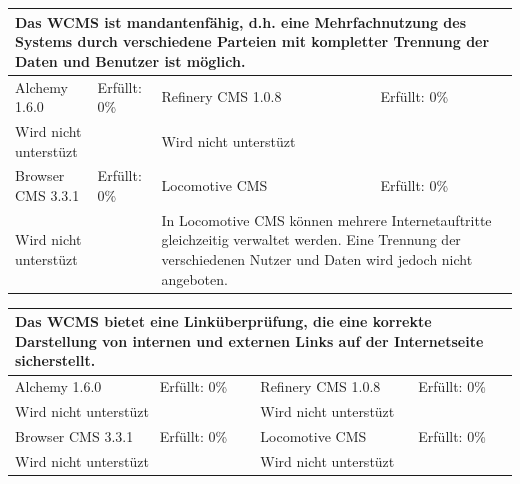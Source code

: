 \begin{tabular}[!ht]{|l|l|l|l|}
\hline
\multicolumn{4}{|p{15cm}|}{\textbf{Das WCMS ist mandantenfähig, d.h. eine Mehrfachnutzung des Systems durch verschiedene Parteien mit kompletter Trennung der Daten und Benutzer ist möglich.}} \\
\hline
  Alchemy 1.6.0 & \cellcolor{red}Erfüllt: 0\% & Refinery CMS 1.0.8 & \cellcolor{red}Erfüllt: 0\% \\
  \hline
  \multicolumn{2}{|p{7.5cm}|}{Wird nicht unterstüzt} & \multicolumn{2}{p{7.5cm}|}{Wird nicht unterstüzt} \\
  \hline
  Browser CMS 3.3.1 & \cellcolor{red}Erfüllt: 0\% & Locomotive CMS & \cellcolor{red}Erfüllt: 0\% \\
  \hline
  \multicolumn{2}{|p{7.5cm}|}{Wird nicht unterstüzt} & \multicolumn{2}{p{7.5cm}|}{In Locomotive CMS können mehrere Internetauftritte gleichzeitig verwaltet werden. Eine Trennung der verschiedenen Nutzer und Daten wird jedoch nicht angeboten.} \\
\hline
\end{tabular}
\newline
\newline
\newline
\begin{tabular}[!ht]{|l|l|l|l|}
\hline
\multicolumn{4}{|p{15cm}|}{\textbf{Das WCMS bietet eine Linküberprüfung, die eine korrekte Darstellung von internen und externen Links auf der Internetseite sicherstellt.}} \\
\hline
  Alchemy 1.6.0 & \cellcolor{red}Erfüllt: 0\% & Refinery CMS 1.0.8 & \cellcolor{red}Erfüllt: 0\% \\
  \hline
  \multicolumn{2}{|p{7.5cm}|}{Wird nicht unterstüzt} & \multicolumn{2}{p{7.5cm}|}{Wird nicht unterstüzt} \\
  \hline
  Browser CMS 3.3.1 & \cellcolor{red}Erfüllt: 0\% & Locomotive CMS & \cellcolor{red}Erfüllt: 0\% \\
  \hline
  \multicolumn{2}{|p{7.5cm}|}{Wird nicht unterstüzt} & \multicolumn{2}{p{7.5cm}|}{Wird nicht unterstüzt} \\
\hline
\end{tabular}


